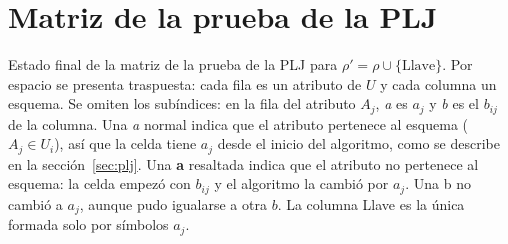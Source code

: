 \section{Matriz de la prueba de la PLJ}\label{sec:matriz}

Estado final de la matriz de la prueba de la PLJ para $\rho' = \rho \cup \{\text{Llave}\}$. Por espacio se presenta traspuesta: cada fila es un atributo de $U$ y cada columna un esquema. Se omiten los subíndices: en la fila del atributo $A_j$, \emph{a} es $a_j$ y \emph{b} es el $b_{ij}$ de la columna. Una \emph{a} normal indica que el atributo pertenece al esquema ($A_j \in U_i$), así que la celda tiene $a_j$ desde el inicio del algoritmo, como se describe en la sección~\ref{sec:plj}. Una \textbf{\color{azuldos}a} resaltada indica que el atributo no pertenece al esquema: la celda empezó con $b_{ij}$ y el algoritmo la cambió por $a_j$. Una {\color{grisclaro}b} no cambió a $a_j$, aunque pudo igualarse a otra $b$. La columna Llave es la única formada solo por símbolos $a_j$.


